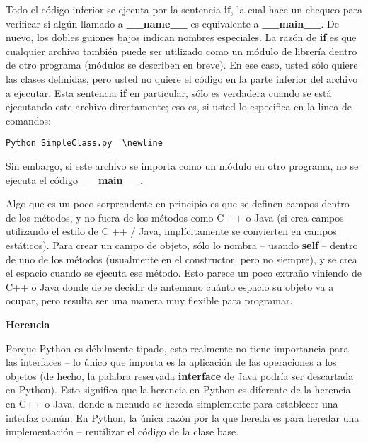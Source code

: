 Todo el código inferior se ejecuta por la sentencia \textbf{if}, la cual hace un chequeo para verificar si algún llamado a \textbf{\_\_name\_\_} es equivalente a \textbf{\_\_main\_\_}. De nuevo, los dobles guiones bajos indican nombres especiales. La razón de \textbf{if} es que cualquier archivo también puede ser utilizado como un módulo de librería dentro de otro programa (módulos se describen en breve). En ese caso, usted sólo quiere las clases definidas, pero usted no quiere el código en la parte inferior del archivo a ejecutar. Esta sentencia \textbf{if} en particular, sólo es verdadera cuando se está ejecutando este archivo directamente; eso es, si usted lo especifica en la línea de comandos: \newline

\begin{lstlisting}
Python SimpleClass.py  \newline 
\end{lstlisting}

Sin embargo, si este archivo se importa como un módulo en otro programa, no se ejecuta el código \textbf{\_\_main\_\_}. \newline

Algo que es un poco sorprendente en principio es que se definen campos dentro de los métodos, y no fuera de los métodos como C ++ o Java (si crea campos utilizando el estilo de C ++ / Java, implícitamente se convierten en campos estáticos). Para crear un campo de objeto, sólo lo nombra – usando \textbf{self} – dentro de uno de los métodos (usualmente en el constructor, pero no siempre), y se crea el espacio cuando se ejecuta ese método. %
Esto parece un poco extraño viniendo de C++ o Java donde debe decidir de antemano cuánto espacio su objeto va a ocupar, pero resulta ser una manera muy flexible para programar.  \newline


\textbf{Herencia}

Porque Python es débilmente tipado, esto realmente no tiene importancia para las interfaces – lo único que importa es la aplicación de las operaciones a los objetos (de hecho, la palabra reservada \textbf{interface} de Java podría ser descartada en Python). Esto significa que la herencia en Python es diferente de la herencia en C++ o Java, donde a menudo se hereda simplemente para establecer una interfaz común. En Python, la única razón por la que hereda es para heredar una implementación – reutilizar el código de la clase base. \newline


